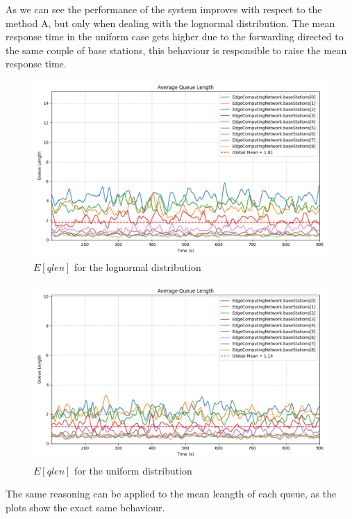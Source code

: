 \documentclass{report}
\begin{document}
As we can see the performance of the system improves with respect to the method A, but only when dealing with the lognormal distribution. The mean response time in the uniform case gets higher due to the forwarding directed to the same couple of base stations, this behaviour is responsible to raise the mean response time.

\begin{figure}[H]
    \centering
    \includegraphics[width=\textwidth]{img/plots/log_1e3_B/qlen.png}
    \caption{$E[qlen]$ for the lognormal distribution}
\end{figure}

\begin{figure}[H]
    \centering
    \includegraphics[width=\textwidth]{img/plots/uni_1e3_B/qlen.png}
    \caption{$E[qlen]$ for the uniform distribution}
\end{figure}

The same reasoning can be applied to the mean leangth of each queue, as the plots show the exact same behaviour.
\end{document}
